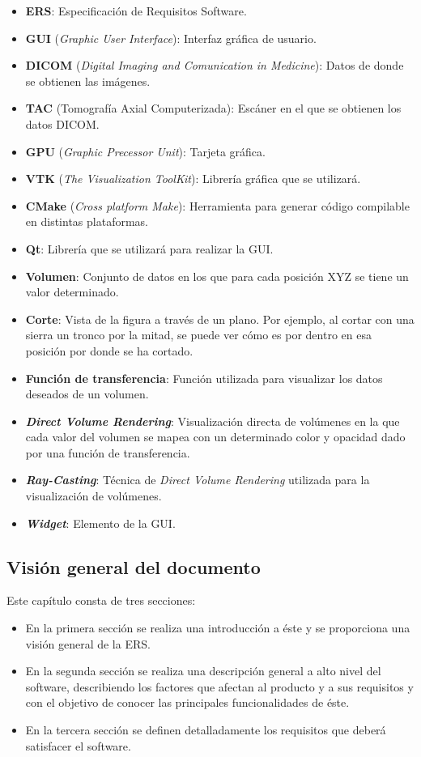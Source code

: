 	\begin{itemize}
		\item \textbf{ERS}: Especificación de Requisitos Software.
		\item \textbf{GUI} (\textit{Graphic User Interface}): Interfaz gráfica de usuario.
		\item \textbf{DICOM} (\textit{Digital Imaging and Comunication in Medicine}): Datos de donde se obtienen las imágenes.
		\item \textbf{TAC} (Tomografía Axial Computerizada): Escáner en el que se obtienen los datos DICOM.
		\item \textbf{GPU} (\textit{Graphic Precessor Unit}): Tarjeta gráfica.
		\item \textbf{VTK} (\textit{The Visualization ToolKit}): Librería gráfica que se utilizará.
		\item \textbf{CMake} (\textit{Cross platform Make}): Herramienta para generar código compilable en distintas plataformas.
		\item \textbf{Qt}: Librería que se utilizará para realizar la GUI.
		\item \textbf{Volumen}: Conjunto de datos en los que para cada posición XYZ se tiene un valor determinado.
		\item \textbf{Corte}: Vista de la figura a través de un plano. Por ejemplo, al cortar con una sierra un tronco por la mitad, se puede ver cómo es por dentro en esa posición por donde se ha cortado.
		\item \textbf{Función de transferencia}: Función utilizada para visualizar los datos deseados de un volumen.
		\item \textbf{\textit{Direct Volume Rendering}}: Visualización directa de volúmenes en la que cada valor del volumen se mapea con un determinado color y opacidad dado por una función de transferencia.
		\item \textbf{\textit{Ray-Casting}}: Técnica de \textit{Direct Volume Rendering} utilizada para la visualización de volúmenes.
		\item \textbf{\textit{Widget}}: Elemento de la GUI.
	\end{itemize}
	
	\subsection{Visión general del documento}
	
	Este capítulo consta de tres secciones:
	\begin{itemize}
		\item En la primera sección se realiza una introducción a éste y se proporciona una visión general de la ERS.
		\item En la segunda sección se realiza una descripción general a alto nivel del software, describiendo los factores que afectan al producto y a sus requisitos y con el objetivo de conocer las principales funcionalidades de éste.
		\item En la tercera sección se definen detalladamente los requisitos que deberá satisfacer el software.
	\end{itemize}

